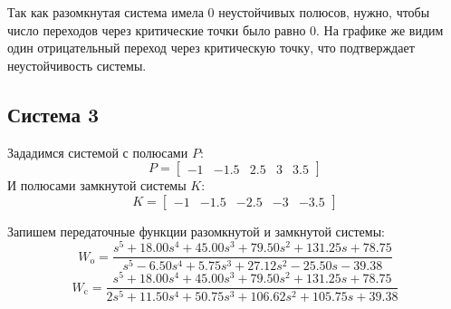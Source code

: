 Так как разомкнутая система имела 0 неустойчивых полюсов, нужно, чтобы число переходов через критические точки было равно 0.
На графике же видим один отрицательный переход через критическую точку, что подтверждает неустойчивость системы.

\FloatBarrier
\subsection{Система 3}
Зададимся системой с полюсами $P$:
\begin{equation}
    P = \begin{bmatrix}
        -1 & -1.5 & 2.5 & 3 & 3.5
    \end{bmatrix}
\end{equation}
И полюсами замкнутой системы $K$:
\begin{equation}
    K = \begin{bmatrix}
        -1 & -1.5 & -2.5 & -3 & -3.5
    \end{bmatrix}
\end{equation}

Запишем передаточные функции разомкнутой и замкнутой системы:
\begin{equation}
    W_{\text{o}} = \frac{s^5 +18.00s^4 +45.00s^3 +79.50s^2 +131.25s +78.75}{s^5 -6.50s^4 +5.75s^3 +27.12s^2 -25.50s -39.38}
\end{equation}
\begin{equation}
    W_{\text{c}} = \frac{s^5 +18.00s^4 +45.00s^3 +79.50s^2 +131.25s +78.75}{2s^5 +11.50s^4 +50.75s^3 +106.62s^2 +105.75s +39.38}
\end{equation}

